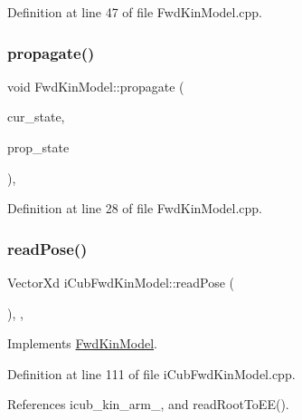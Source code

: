 Definition at line 47 of file Fwd\+Kin\+Model.\+cpp.

\mbox{\label{classFwdKinModel_a9461ff14a1ae8d05169e8f1c7a6237c7}} 
\subsubsection{\texorpdfstring{propagate()}{propagate()}}
{\footnotesize\ttfamily void Fwd\+Kin\+Model\+::propagate (\begin{DoxyParamCaption}\item[{const Eigen\+::\+Ref$<$ const Eigen\+::\+Matrix\+Xf $>$ \&}]{cur\+\_\+state,  }\item[{Eigen\+::\+Ref$<$ Eigen\+::\+Matrix\+Xf $>$}]{prop\+\_\+state }\end{DoxyParamCaption})\hspace{0.3cm}{\ttfamily [override]}, {\ttfamily [inherited]}}



Definition at line 28 of file Fwd\+Kin\+Model.\+cpp.

\mbox{\label{classiCubFwdKinModel_ad549519048e9b54c18af51c6b173b726}} 
\subsubsection{\texorpdfstring{read\+Pose()}{readPose()}}
{\footnotesize\ttfamily Vector\+Xd i\+Cub\+Fwd\+Kin\+Model\+::read\+Pose (\begin{DoxyParamCaption}{ }\end{DoxyParamCaption})\hspace{0.3cm}{\ttfamily [override]}, {\ttfamily [protected]}, {\ttfamily [virtual]}}



Implements \hyperlink{classFwdKinModel_aaad9ff96f725fc529672e12aed86dc02}{Fwd\+Kin\+Model}.



Definition at line 111 of file i\+Cub\+Fwd\+Kin\+Model.\+cpp.



References icub\+\_\+kin\+\_\+arm\+\_\+, and read\+Root\+To\+E\+E().


